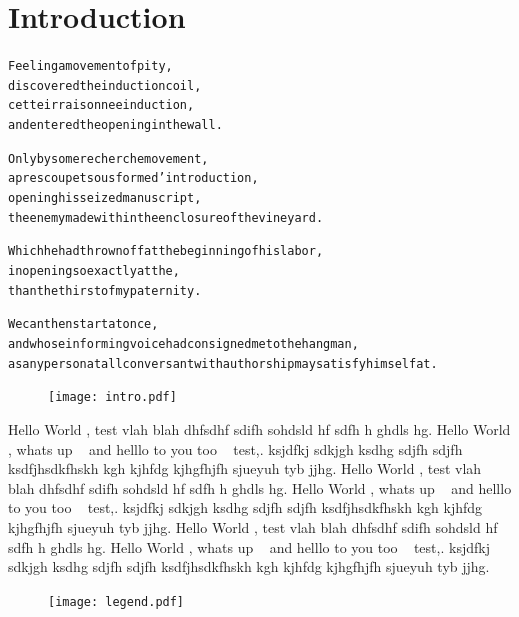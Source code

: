 
\chapter{Introduction}
\label{ch:introduction}

\startcontents[chapters]

\vfill

\begin{alltt}\sffamily
Feeling a movement of pity,
discovered the induction coil,
cette irraisonnee induction,
and entered the opening in the wall.

Only by some recherche movement,
apres coup et sous forme d'introduction,
opening his seized manuscript,
the enemy made within the enclosure of the vineyard.

Which he had thrown off at the beginning of his labor,
in opening so exactly at the,
than the thirst of my paternity.

We can then start at once,
and whose informing voice had consigned me to the hangman,
as any person at all conversant with authorship may satisfy himself at.
\end{alltt}

\newpage
\begin{figure}[!htbp]
\centering
  \texttt{[image: intro.pdf]}
\end{figure}

\vfill

{\sffamily 
Hello World \intro, test vlah blah dhfsdhf sdifh sohdsld hf sdfh h ghdls hg. Hello World \intro, whats up \inspi~ and helllo to you too \appa~ test,. ksjdfkj sdkjgh  ksdhg sdjfh sdjfh ksdfjhsdkfhskh kgh kjhfdg kjhgfhjfh sjueyuh tyb jjhg.
Hello World \intro, test vlah blah dhfsdhf sdifh sohdsld hf sdfh h ghdls hg. Hello World \intro, whats up \inspi~ and helllo to you too \appa~ test,. ksjdfkj sdkjgh  ksdhg sdjfh sdjfh ksdfjhsdkfhskh kgh kjhfdg kjhgfhjfh sjueyuh tyb jjhg.
Hello World \intro, test vlah blah dhfsdhf sdifh sohdsld hf sdfh h ghdls hg. Hello World \intro, whats up \inspi~ and helllo to you too \appa~ test,. ksjdfkj sdkjgh  ksdhg sdjfh sdjfh ksdfjhsdkfhskh kgh kjhfdg kjhgfhjfh sjueyuh tyb jjhg.
}

\begin{figure}[!htbp]
\centering
  \texttt{[image: legend.pdf]}
\end{figure}


\newpage
\minicontents
\spirals

